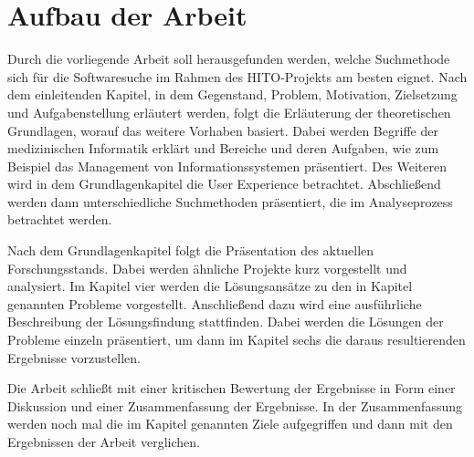 \section{Aufbau der Arbeit}\label{sec:aufbau}

Durch die vorliegende Arbeit soll herausgefunden werden, welche Suchmethode sich für die Softwaresuche im Rahmen des HITO-Projekts am besten eignet. Nach dem einleitenden Kapitel, in dem Gegenstand, Problem, Motivation, Zielsetzung und Aufgabenstellung erläutert werden, folgt die Erläuterung der theoretischen Grundlagen, worauf das weitere Vorhaben basiert. Dabei werden Begriffe der medizinischen Informatik erklärt und Bereiche und deren Aufgaben, wie zum Beispiel das Management von Informationssystemen präsentiert. Des Weiteren wird in dem Grundlagenkapitel die User Experience betrachtet. Abschließend werden dann unterschiedliche Suchmethoden präsentiert, die im Analyseprozess betrachtet werden.

Nach dem Grundlagenkapitel folgt die Präsentation des aktuellen Forschungsstands. Dabei werden ähnliche Projekte kurz vorgestellt und analysiert. Im Kapitel vier werden die Lösungsansätze zu den in Kapitel  genannten Probleme vorgestellt. Anschließend dazu wird eine ausführliche Beschreibung der Lösungsfindung stattfinden. Dabei werden die Lösungen der Probleme einzeln präsentiert, um dann im Kapitel sechs die daraus resultierenden Ergebnisse vorzustellen.

Die Arbeit schließt mit einer kritischen Bewertung der Ergebnisse in Form einer Diskussion und einer Zusammenfassung der Ergebnisse. In der Zusammenfassung werden noch mal die im Kapitel  genannten Ziele aufgegriffen und dann mit den Ergebnissen der Arbeit verglichen.



